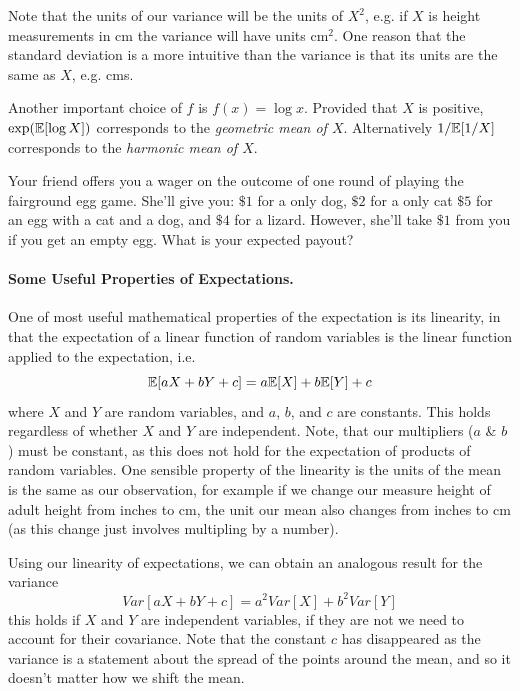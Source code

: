 Note that the units of our variance will be the units of $X^2$,
e.g. if $X$ is height measurements in cm the variance will have units
cm$^2$. One reason that the standard deviation is a more intuitive
than the variance is that its units are the same as $X$, e.g.  cms. 

Another important choice of $f$ is $f(x)=\log x$. Provided that $X$ is positive, $\exp(\mathbb{E}[\log X])$ corresponds to the  \emph{geometric mean of $X$}. Alternatively $1/\mathbb{E}[1/X]$ corresponds to the \emph{harmonic mean of $X$}. 


\begin{question}
Your friend offers you a wager on the outcome of one round of playing the
fairground egg game. She'll give you: $\$1$ for a only dog, $\$2$ for
a only cat
$\$5$ for an egg with a cat and a dog, and $\$4$ for a
lizard. However, she'll take $\$1$ from you if you get an empty
egg. What is your expected payout?
  \end{question}

\paragraph{Some Useful Properties of Expectations.}
One of most useful mathematical properties of the expectation is its
linearity, in that the expectation of a linear function of random
variables is the linear function applied to the expectation, i.e. 
\begin{equation}
\mathbb{E}[aX+bY+c]= a\mathbb{E}[X] + b \mathbb{E}[Y] +c \label{eqn:linearity_expectation}
\end{equation}
where $X$ and $Y$ are random variables, and $a$, $b$, and $c$ are
constants. This holds regardless of whether $X$ and $Y$ are
independent. Note, that our multipliers ($a$ \& $b$) must be constant, as
this does not hold for the expectation of products of random
variables. One sensible property of the linearity is the units of the
mean is the same as our observation, for example if we change our measure height
of adult height from inches to cm, the unit our mean also changes from
inches to cm (as this change just involves multipling by a number). 

Using our linearity of expectations, we can obtain an analogous result for the variance
\begin{equation}
Var[aX+bY+c]= a^2Var[X] + b^2 Var[Y] \label{eqn:general_var_decomp}
\end{equation}
this holds if $X$ and $Y$ are independent variables, if they are not
we need to account for their covariance. Note that the constant $c$
has disappeared as the variance is a statement about the spread of the
points around the mean, and so it doesn't matter how we shift the
mean. 

